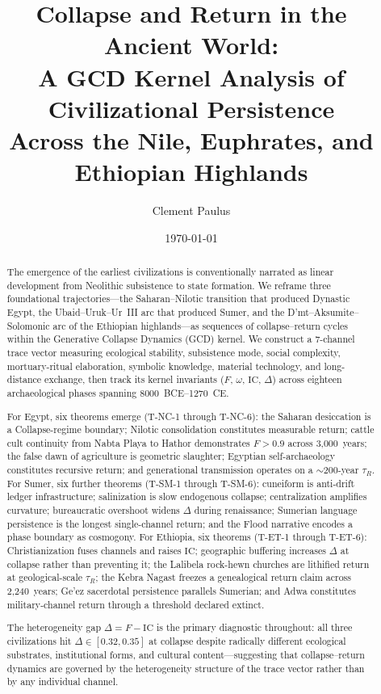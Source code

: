 \documentclass[
  aps,
  prd,
  twocolumn,
  superscriptaddress,
  nofootinbib,
  floatfix
]{revtex4-2}
\newcommand{\tR}{\tau_{\!R}}
\newcommand{\IC}{\mathrm{IC}}
\begin{document}
\title{Collapse and Return in the Ancient World:\\
A GCD Kernel Analysis of Civilizational Persistence\\
Across the Nile, Euphrates, and Ethiopian Highlands}

\author{Clement Paulus}

\date{\today}

\begin{abstract}
The emergence of the earliest civilizations is
conventionally narrated as linear development from
Neolithic subsistence to state formation.  We reframe
three foundational trajectories---the Saharan--Nilotic
transition that produced Dynastic Egypt, the
Ubaid--Uruk--Ur~III arc that produced Sumer, and the
D'mt--Aksumite--Solomonic arc of the Ethiopian
highlands---as sequences of collapse--return cycles
within the Generative Collapse Dynamics (GCD)
kernel.  We construct a 7-channel trace vector
measuring ecological stability, subsistence mode,
social complexity, mortuary-ritual elaboration,
symbolic knowledge, material technology, and
long-distance exchange, then track its kernel
invariants ($F$, $\omega$, $\IC$, $\Delta$) across
eighteen archaeological phases spanning
8000~BCE--1270~CE.

For Egypt, six theorems emerge (T-NC-1 through
T-NC-6): the Saharan desiccation is a
Collapse-regime boundary; Nilotic consolidation
constitutes measurable return; cattle cult continuity
from Nabta Playa to Hathor demonstrates $F > 0.9$
across 3,000~years; the false dawn of agriculture is
geometric slaughter; Egyptian self-archaeology
constitutes recursive return; and generational
transmission operates on a $\sim$200-year $\tR$.
For Sumer, six further theorems (T-SM-1 through
T-SM-6): cuneiform is anti-drift ledger
infrastructure; salinization is slow endogenous
collapse; centralization amplifies curvature;
bureaucratic overshoot widens $\Delta$ during
renaissance; Sumerian language persistence is the
longest single-channel return; and the Flood
narrative encodes a phase boundary as cosmogony.
For Ethiopia, six theorems (T-ET-1 through T-ET-6):
Christianization fuses channels and raises $\IC$;
geographic buffering increases $\Delta$ at collapse
rather than preventing it; the Lalibela rock-hewn
churches are lithified return at geological-scale
$\tR$; the Kebra Nagast freezes a genealogical
return claim across 2,240~years; Ge'ez sacerdotal
persistence parallels Sumerian; and Adwa constitutes
military-channel return through a threshold declared
extinct.

The heterogeneity gap $\Delta = F - \IC$ is the
primary diagnostic throughout: all three
civilizations hit $\Delta \in [0.32, 0.35]$ at
collapse despite radically different ecological
substrates, institutional forms, and cultural
content---suggesting that collapse--return dynamics
are governed by the heterogeneity structure of the
trace vector rather than by any individual channel.
\end{abstract}
\end{document}
